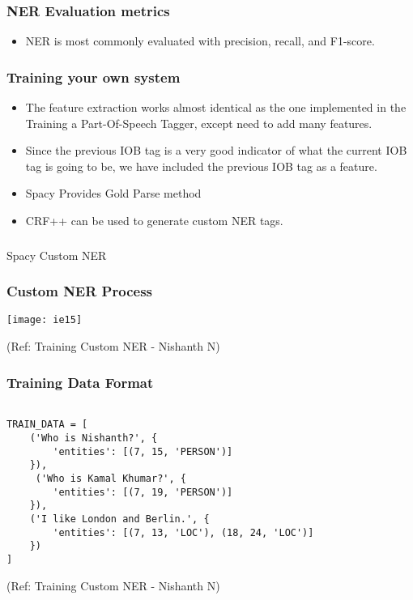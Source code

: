 \begin{frame}[fragile]\frametitle{NER Evaluation metrics}
  \begin{itemize}
  \item NER is most commonly evaluated with precision, recall, and F1-score.
  \end{itemize}
\end{frame}


\begin{frame}[fragile]\frametitle{Training your own system}
  \begin{itemize}
  \item The feature extraction works almost identical as the one implemented in the Training a Part-Of-Speech Tagger, except need to add many features.
  \item Since the previous IOB tag is a very good indicator of what the current IOB tag is going to be, we have included the previous IOB tag as a feature.
  \item Spacy Provides Gold Parse method
  \item CRF++ can be used to generate custom NER tags.
  \end{itemize}
\end{frame}

\begin{frame}[fragile]\frametitle{}

\begin{center}
{\Large Spacy Custom NER}
\end{center}
\end{frame}

\begin{frame}[fragile]\frametitle{Custom NER Process}


\begin{center}
\texttt{[image: ie15]}
\end{center}

{\tiny (Ref: Training Custom NER - Nishanth N)}

\end{frame}

\begin{frame}[fragile]\frametitle{Training Data Format}


\begin{lstlisting}

TRAIN_DATA = [
    ('Who is Nishanth?', {
        'entities': [(7, 15, 'PERSON')]
    }),
     ('Who is Kamal Khumar?', {
        'entities': [(7, 19, 'PERSON')]
    }),
    ('I like London and Berlin.', {
        'entities': [(7, 13, 'LOC'), (18, 24, 'LOC')]
    })
]
\end{lstlisting}

{\tiny (Ref: Training Custom NER - Nishanth N)}

\end{frame}

